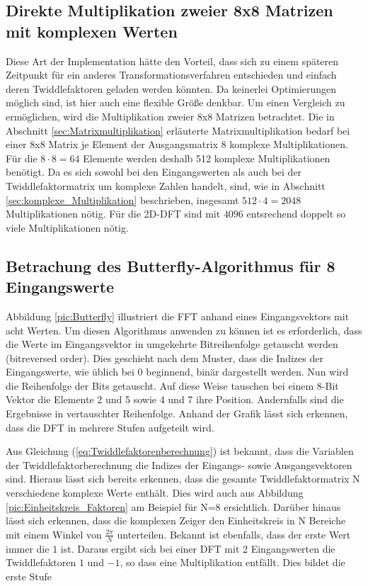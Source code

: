 \subsection{Direkte Multiplikation zweier 8x8 Matrizen mit komplexen Werten}
Diese Art der Implementation hätte den Vorteil, dass sich zu einem späteren Zeitpunkt für ein anderes
Transformationsverfahren entschieden und einfach deren Twiddlefaktoren geladen werden könnten.
Da keinerlei Optimierungen möglich sind, ist hier auch eine flexible Größe denkbar. Um einen Vergleich
zu ermöglichen, wird die Multiplikation zweier 8x8 Matrizen betrachtet.
Die in Abschnitt \ref{sec:Matrixmultiplikation} erläuterte Matrixmultiplikation bedarf bei einer 8x8 Matrix je Element der Ausgangsmatrix 8 komplexe Multiplikationen. Für
die $8\cdot8=64$ Elemente werden deshalb 512 komplexe Multiplikationen benötigt. Da es sich sowohl bei den Eingangswerten als auch bei der Twiddlefaktormatrix um komplexe
Zahlen handelt, sind, wie in Abschnitt \ref{sec:komplexe_Multiplikation} beschrieben, insgesamt $512\cdot4=2048$ Multiplikationen nötig.
Für die 2D-DFT sind mit $4096$ entsrechend doppelt so viele Multiplikationen nötig.



\subsection{Betrachung des Butterfly-Algorithmus für 8 Eingangswerte} 
Abbildung \ref{pic:Butterfly} illustriert die FFT anhand eines Eingangsvektors mit acht Werten. 
Um diesen Algorithmus anwenden zu können ist es erforderlich, dass die Werte im Eingangsvektor in umgekehrte Bitreihenfolge getauscht werden (bitreversed order).
Dies geschieht nach dem Muster, dass die Indizes der Eingangswerte, wie
üblich bei 0 beginnend, binär dargestellt werden. Nun wird die Reihenfolge der Bits getauscht. Auf diese Weise tauschen bei einem 8-Bit Vektor die
Elemente 2 und 5 sowie 4 und 7 ihre Position. Andernfalls sind die Ergebnisse in vertauschter Reihenfolge.
Anhand der Grafik lässt sich erkennen, dass die DFT in mehrere Stufen aufgeteilt wird.

Aus Gleichung (\ref{eq:Twiddlefaktorenberechnung}) ist 
bekannt, dass die Variablen der Twiddlefaktorberechnung die Indizes der Eingangs- sowie Ausgangsvektoren sind. Hieraus lässt sich bereits erkennen, dass
die gesamte Twiddlefaktormatrix N verschiedene komplexe Werte enthält. Dies wird auch aus Abbildung \ref{pic:Einheitskreis_Faktoren} am Beispiel für N=8 ersichtlich. 
Darüber hinaus lässt sich erkennen, dass die komplexen Zeiger den Einheitskreis 
in N Bereiche mit einem Winkel von $\frac{2 \pi}{N}$ unterteilen. Bekannt ist ebenfalls, dass der erste Wert immer die $1$ ist.
Daraus ergibt sich bei einer DFT mit 2 Eingangswerten die Twiddlefaktoren $1$ und $-1$, so dass eine Multiplikation entfällt. Dies bildet die erste Stufe

